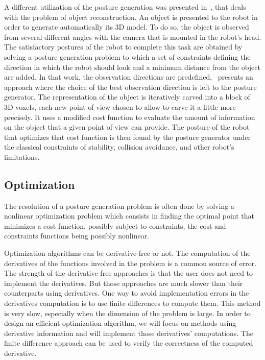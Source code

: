 A different utilization of the posture generation was presented in~\cite{stasse:humanoids:2007}, that deals with the problem of object reconstruction.
An object is presented to the robot in order to generate automatically its 3D model.
To do so, the object is observed from several different angles with the camera that is mounted in the robot's head.
The satisfactory postures of the robot to complete this task are obtained by solving a posture generation problem to which a set of constraints defining the direction in which the robot should look and a minimum distance from the object are added.
In that work, the observation directions are predefined,~\cite{foissotte:humanoids:2008} presents an approach where the choice of the best observation direction is left to the posture generator.
The representation of the object is iteratively carved into a block of 3D voxels, each new point-of-view chosen to allow to carve it a little more precisely.
It uses a modified cost function to evaluate the amount of information on the object that a given point of view can provide.
The posture of the robot that optimizes that cost function is then found by the posture generator under the classical constraints of stability, collision avoidance, and other robot's limitations.


\subsection{Optimization}
\label{sub:optimization}

The resolution of a posture generation problem is often done by solving a nonlinear optimization problem which consists in finding the optimal point that minimizes a cost function, possibly subject to constraints, the cost and constraints functions being possibly nonlinear.

Optimization algorithms can be derivative-free or not.
The computation of the derivatives of the functions involved in the problem is a common source of error.
The strength of the derivative-free approaches is that the user does not need to implement the derivatives.
But those approaches are much slower than their counterparts using derivatives.
One way to avoid implementation errors in the derivatives computation is to use finite differences to compute them.
This method is very slow, especially when the dimension of the problem is large.
In order to design an efficient optimization algorithm, we will focus on methods using derivative information and will implement those derivatives' computations.
The finite difference approach can be used to verify the correctness of the computed derivative.

